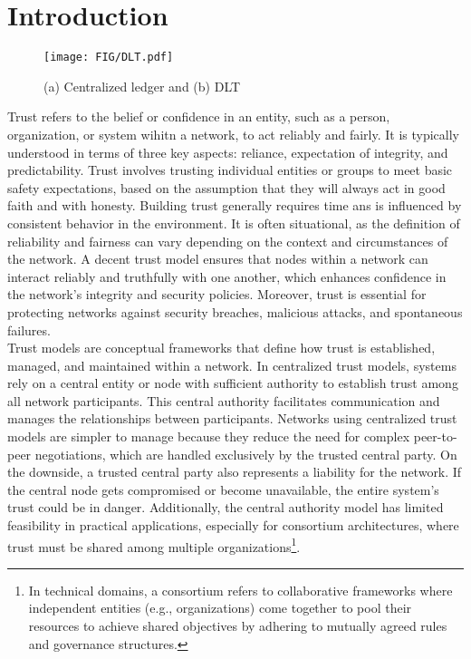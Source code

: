 \documentclass[conference]{IEEEtran}
\begin{document}
\section{Introduction}
%
\begin{figure*}
    \centering
    \texttt{[image: FIG/DLT.pdf]}
    \caption{(a) Centralized ledger and (b) DLT}
    \label{fig:DLT}
\end{figure*}
%
Trust refers to the belief or confidence in an entity, such as a person, organization, or system wihitn a network, to act reliably and fairly. It is typically understood in terms of three key aspects: reliance, expectation of integrity, and predictability. Trust involves trusting individual entities or groups to meet basic safety expectations, based on the assumption that they will always act in good faith and with honesty. Building trust generally requires time ans is influenced by consistent behavior in the environment. It is often situational, as the definition of reliability and fairness can vary depending on the context and circumstances of the network. A decent trust model ensures that nodes within a network can interact reliably and truthfully with one another, which enhances confidence in the network's integrity and security policies. Moreover, trust is essential for protecting networks against security breaches, malicious attacks, and spontaneous failures. \\

Trust models are conceptual frameworks that define how trust is established, managed, and maintained within a network. In centralized trust models, systems rely on a central entity or node with sufficient authority to establish trust among all network participants. This central authority facilitates communication and manages the relationships between participants. Networks using centralized trust models are simpler to manage because they reduce the need for complex peer-to-peer negotiations, which are handled exclusively by the trusted central party. On the downside, a trusted central party also represents a liability for the network. If the central node gets compromised or become unavailable, the entire system's trust could be in danger. Additionally, the central authority model has limited feasibility in practical applications, especially for consortium architectures, where trust must be shared among multiple organizations\footnote{In technical domains, a consortium refers to collaborative frameworks where independent entities (e.g., organizations) come together to pool their resources to achieve shared objectives by adhering to mutually agreed rules and governance structures.}. \\ 
\end{document}
